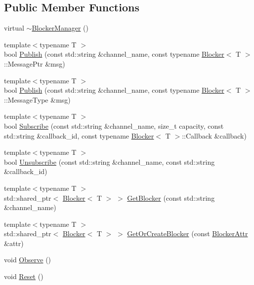 \subsection*{Public Member Functions}
\begin{DoxyCompactItemize}
\item 
virtual \hyperlink{classapollo_1_1cyber_1_1blocker_1_1BlockerManager_a9507c5a941e01053a258badd91d5bb5e}{$\sim$\-Blocker\-Manager} ()
\item 
{\footnotesize template$<$typename T $>$ }\\bool \hyperlink{classapollo_1_1cyber_1_1blocker_1_1BlockerManager_a02cf4d2417c97da763663052e5997c51}{Publish} (const std\-::string \&channel\-\_\-name, const typename \hyperlink{classapollo_1_1cyber_1_1blocker_1_1Blocker}{Blocker}$<$ T $>$\-::Message\-Ptr \&msg)
\item 
{\footnotesize template$<$typename T $>$ }\\bool \hyperlink{classapollo_1_1cyber_1_1blocker_1_1BlockerManager_a9240b9cb2f282a740e863b9e81bbbe06}{Publish} (const std\-::string \&channel\-\_\-name, const typename \hyperlink{classapollo_1_1cyber_1_1blocker_1_1Blocker}{Blocker}$<$ T $>$\-::Message\-Type \&msg)
\item 
{\footnotesize template$<$typename T $>$ }\\bool \hyperlink{classapollo_1_1cyber_1_1blocker_1_1BlockerManager_adf88edc35b0ea77921145adc2298e23b}{Subscribe} (const std\-::string \&channel\-\_\-name, size\-\_\-t capacity, const std\-::string \&callback\-\_\-id, const typename \hyperlink{classapollo_1_1cyber_1_1blocker_1_1Blocker}{Blocker}$<$ T $>$\-::Callback \&callback)
\item 
{\footnotesize template$<$typename T $>$ }\\bool \hyperlink{classapollo_1_1cyber_1_1blocker_1_1BlockerManager_a9275edf629662a3800e3089f3dd91c3a}{Unsubscribe} (const std\-::string \&channel\-\_\-name, const std\-::string \&callback\-\_\-id)
\item 
{\footnotesize template$<$typename T $>$ }\\std\-::shared\-\_\-ptr$<$ \hyperlink{classapollo_1_1cyber_1_1blocker_1_1Blocker}{Blocker}$<$ T $>$ $>$ \hyperlink{classapollo_1_1cyber_1_1blocker_1_1BlockerManager_ae6b3a620a508fac29bc657eac4b88d46}{Get\-Blocker} (const std\-::string \&channel\-\_\-name)
\item 
{\footnotesize template$<$typename T $>$ }\\std\-::shared\-\_\-ptr$<$ \hyperlink{classapollo_1_1cyber_1_1blocker_1_1Blocker}{Blocker}$<$ T $>$ $>$ \hyperlink{classapollo_1_1cyber_1_1blocker_1_1BlockerManager_a8b675f3729363e53c7a09d267c560ac5}{Get\-Or\-Create\-Blocker} (const \hyperlink{structapollo_1_1cyber_1_1blocker_1_1BlockerAttr}{Blocker\-Attr} \&attr)
\item 
void \hyperlink{classapollo_1_1cyber_1_1blocker_1_1BlockerManager_a6577db9e414c1567b9d0df15ccadcb1f}{Observe} ()
\item 
void \hyperlink{classapollo_1_1cyber_1_1blocker_1_1BlockerManager_a5146d37bdbc55c29b2f82ff8b8c6af64}{Reset} ()
\end{DoxyCompactItemize}
